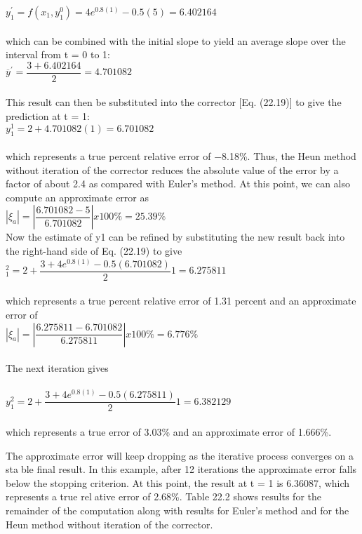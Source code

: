 $y^{'}_{1} = f(x_{1}, y^0_1) = 4e^{0.8(1)} - 0.5(5) = 6.402164$
\\
\\
which can be combined with the initial slope to yield an average slope over the interval
from t = 0 to 1:\\


$\overline{y}^{'} = \dfrac{3 + 6.402164}{2} = 4.701082$
\\
\\
This result can then be substituted into the corrector [Eq. (22.19)] to give the prediction at
t = 1:\\

$y^1_1 = 2 + 4.701082(1) = 6.701082$\\
\\
which represents a true percent relative error of −8.18\%. Thus, the Heun method without
iteration of the corrector reduces the absolute value of the error by a factor of about 2.4 as
compared with Euler’s method. At this point, we can also compute an approximate error as\\

$ |\xi_{a}| = \left| \dfrac{6.701082 − 5}{6.701082} \right| x 100\% = 25.39\% $\\


Now the estimate of y1 can be refined by substituting the new result back into the
right-hand side of Eq. (22.19) to give\\

$^2_1 = 2 + \dfrac{3 + 4e^{0.8(1)} - 0.5(6.701082)}{2} 1 = 6.275811$\\
\\
which represents a true percent relative error of 1.31 percent and an approximate error of\\

$|\xi_{a}| = \left| \dfrac{6.275811 − 6.701082}{6.275811} \right| x 100\% = 6.776\%$\\
\\
The next iteration gives\\
\\
$y^2_1 = 2 + \dfrac{3 + 4e^{0.8(1)} - 0.5(6.275811)}{2}1 = 6.382129$\\
\\
which represents a true error of 3.03\% and an approximate error of 1.666\%.

The approximate error will keep dropping as the iterative process converges on a stable final result. In this example, after 12 iterations the approximate error falls below the
stopping criterion. At this point, the result at t = 1 is 6.36087, which represents a true relative error of 2.68\%. Table 22.2 shows results for the remainder of the computation along
with results for Euler’s method and for the Heun method without iteration of the corrector.
\hline

